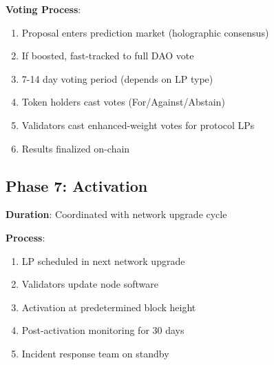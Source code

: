 \textbf{Voting Process}:
\begin{enumerate}
\item Proposal enters prediction market (holographic consensus)
\item If boosted, fast-tracked to full DAO vote
\item 7-14 day voting period (depends on LP type)
\item Token holders cast votes (For/Against/Abstain)
\item Validators cast enhanced-weight votes for protocol LPs
\item Results finalized on-chain
\end{enumerate}

\subsection{Phase 7: Activation}

\textbf{Duration}: Coordinated with network upgrade cycle

\textbf{Process}:
\begin{enumerate}
\item LP scheduled in next network upgrade
\item Validators update node software
\item Activation at predetermined block height
\item Post-activation monitoring for 30 days
\item Incident response team on standby
\end{enumerate}

